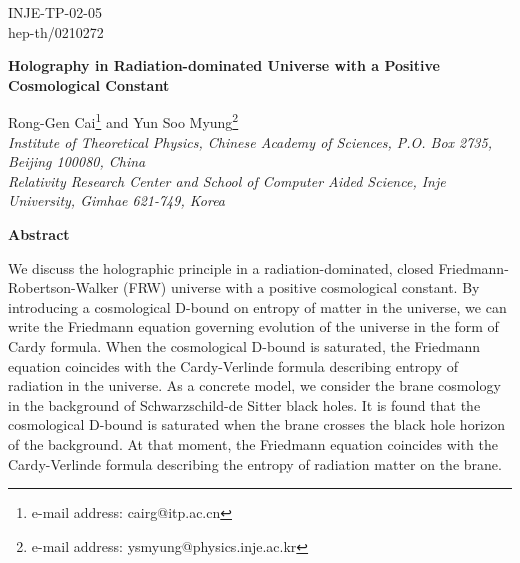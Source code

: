 \documentclass[a4paper,12pt]{article}
\begin{document}
\topmargin 0pt \oddsidemargin 0mm

\renewcommand{\thefootnote}{\fnsymbol{footnote}}
\begin{titlepage}
\begin{flushright}
INJE-TP-02-05\\
hep-th/0210272
\end{flushright}

\vspace{5mm}
\begin{center}
{\Large \bf Holography in Radiation-dominated  Universe with
a Positive Cosmological Constant} \vspace{12mm}

{\large Rong-Gen Cai\footnote{e-mail address: cairg@itp.ac.cn}\coordHE{}
 and Yun Soo Myung\footnote{e-mail
 address: ysmyung@physics.inje.ac.kr}\coordHE{}}
 \\
\vspace{10mm} {\em {}\coordHE{} Institute of Theoretical Physics, Chinese
Academy of Sciences, P.O. Box 2735, Beijing 100080, China \\
\coordHE{} Relativity Research Center and School of Computer Aided
Science, Inje University, Gimhae 621-749, Korea}
\end{center}

\vspace{5mm} \centerline{{\bf{Abstract}}}
 \vspace{5mm}
We discuss the holographic principle in a radiation-dominated,
closed Friedmann-Robertson-Walker (FRW) universe with a positive
cosmological constant. By introducing a cosmological D-bound on
entropy of matter in the universe, we can write the Friedmann equation 
governing evolution of the universe in the form of Cardy formula. When 
the cosmological D-bound is saturated, the Friedmann equation coincides 
with the Cardy-Verlinde formula describing entropy of radiation in the
universe.  As a concrete model, we consider the brane cosmology in the 
background of Schwarzschild-de Sitter black holes. It is found that the 
cosmological D-bound is saturated when the brane crosses the black hole 
horizon of the background. At that moment, the Friedmann equation
coincides with the Cardy-Verlinde formula describing the entropy
of radiation matter on the brane.



\end{titlepage}

\newpage
\renewcommand{\thefootnote}{\arabic{footnote}}
\setcounter{footnote}{0} \setcounter{page}{2}
\end{document}
